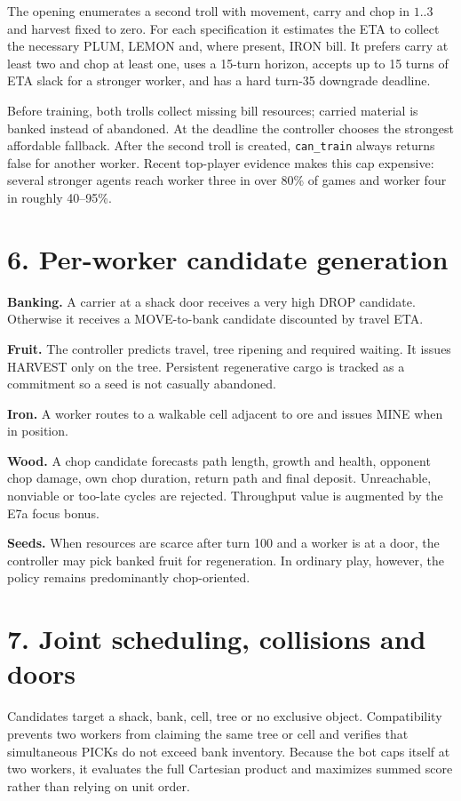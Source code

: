 \documentclass[10pt,a4paper]{article}
\begin{document}
The opening enumerates a second troll with movement, carry and chop in $1..3$ and harvest
fixed to zero. For each specification it estimates the ETA to collect the necessary PLUM,
LEMON and, where present, IRON bill. It prefers carry at least two and chop at least one,
uses a 15-turn horizon, accepts up to 15 turns of ETA slack for a stronger worker, and has
a hard turn-35 downgrade deadline.

Before training, both trolls collect missing bill resources; carried material is banked
instead of abandoned. At the deadline the controller chooses the strongest affordable
fallback. After the second troll is created, \texttt{can\_train} always returns false for
another worker. Recent top-player evidence makes this cap expensive: several stronger
agents reach worker three in over 80\% of games and worker four in roughly 40--95\%.

\section*{6. Per-worker candidate generation}

\textbf{Banking.} A carrier at a shack door receives a very high DROP candidate. Otherwise
it receives a MOVE-to-bank candidate discounted by travel ETA.

\textbf{Fruit.} The controller predicts travel, tree ripening and required waiting. It
issues HARVEST only on the tree. Persistent regenerative cargo is tracked as a commitment
so a seed is not casually abandoned.

\textbf{Iron.} A worker routes to a walkable cell adjacent to ore and issues MINE when in
position.

\textbf{Wood.} A chop candidate forecasts path length, growth and health, opponent chop
damage, own chop duration, return path and final deposit. Unreachable, nonviable or too-late
cycles are rejected. Throughput value is augmented by the E7a focus bonus.

\textbf{Seeds.} When resources are scarce after turn 100 and a worker is at a door, the
controller may pick banked fruit for regeneration. In ordinary play, however, the policy
remains predominantly chop-oriented.

\section*{7. Joint scheduling, collisions and doors}

Candidates target a shack, bank, cell, tree or no exclusive object. Compatibility prevents
two workers from claiming the same tree or cell and verifies that simultaneous PICKs do not
exceed bank inventory. Because the bot caps itself at two workers, it evaluates the full
Cartesian product and maximizes summed score rather than relying on unit order.
\end{document}
